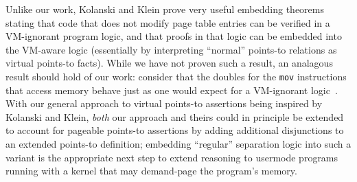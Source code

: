 \ifPLDI
\else
Unlike our work, Kolanski and Klein prove very useful embedding theorems stating that code that does not modify page table 
entries can be verified in a VM-ignorant program logic, and that proofs in that logic can be embedded into the VM-aware logic 
(essentially by interpreting ``normal'' points-to relations as virtual points-to facts). While we have not proven such a result,
an analagous result {should} hold of our work: consider that the doubles for the \texttt{mov} instructions
that access memory behave just as one would expect for a VM-ignorant logic~\cite{Chlipala2013Bedrock}.
With our general approach to virtual points-to assertions being inspired by Kolanski and Klein, \emph{both}
 our approach and theirs could in principle be extended to account for pageable points-to assertions by adding additional 
disjunctions to an extended points-to definition; embedding ``regular'' separation logic into such a variant
is the appropriate next step to extend reasoning to usermode programs running with a kernel that may demand-page the program's
memory.
\fi


